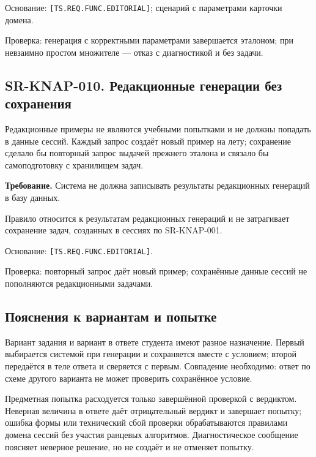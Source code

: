 \documentclass[12pt,a4paper]{article}
\begin{document}
Основание: \texttt{[TS.\allowbreak{}REQ.\allowbreak{}FUNC.\allowbreak{}EDITORIAL]}; сценарий с параметрами карточки домена.

Проверка: генерация с корректными параметрами завершается эталоном; при невзаимно простом множителе --- отказ с диагностикой и без задачи.

\subsection{SR-KNAP-010. Редакционные генерации без сохранения}\label{sr-knap-010-ux440ux435ux434ux430ux43aux446ux438ux43eux43dux43dux44bux435-ux433ux435ux43dux435ux440ux430ux446ux438ux438-ux431ux435ux437-ux441ux43eux445ux440ux430ux43dux435ux43dux438ux44f}

\hypertarget{sr-knap-010-редакционные-генерации-без-сохранения}{}

Редакционные примеры не являются учебными попытками и не должны попадать в данные сессий. Каждый запрос создаёт новый пример на лету; сохранение сделало бы повторный запрос выдачей прежнего эталона и связало бы самоподготовку с хранилищем задач.

\textbf{Требование.} Система не должна записывать результаты редакционных генераций в базу данных.

Правило относится к результатам редакционных генераций и не затрагивает сохранение задач, созданных в сессиях по SR-KNAP-001.

Основание: \texttt{[TS.\allowbreak{}REQ.\allowbreak{}FUNC.\allowbreak{}EDITORIAL]}.

Проверка: повторный запрос даёт новый пример; сохранённые данные сессий не пополняются редакционными задачами.

\subsection{Пояснения к вариантам и попытке}\label{ux43fux43eux44fux441ux43dux435ux43dux438ux44f-ux43a-ux432ux430ux440ux438ux430ux43dux442ux430ux43c-ux438-ux43fux43eux43fux44bux442ux43aux435}

\hypertarget{пояснения-к-вариантам-и-попытке}{}

Вариант задания и вариант в ответе студента имеют разное назначение. Первый выбирается системой при генерации и сохраняется вместе с условием; второй передаётся в теле ответа и сверяется с первым. Совпадение необходимо: ответ по схеме другого варианта не может проверить сохранённое условие.

Предметная попытка расходуется только завершённой проверкой с вердиктом. Неверная величина в ответе даёт отрицательный вердикт и завершает попытку; ошибка формы или технический сбой проверки обрабатываются правилами домена сессий без участия ранцевых алгоритмов. Диагностическое сообщение поясняет неверное решение, но не создаёт и не отменяет попытку.
\end{document}
